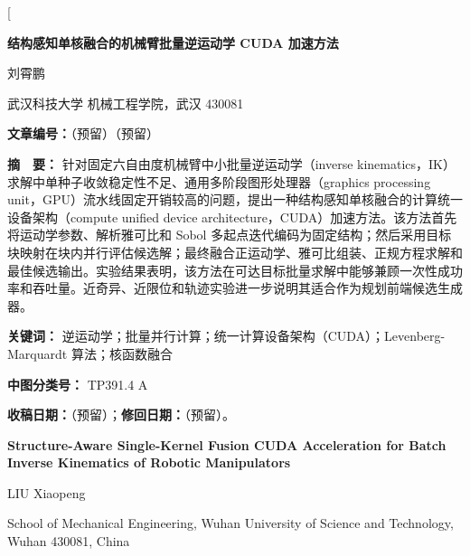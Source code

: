 \documentclass[twocolumn,a4paper,10pt]{ctexart}
\begin{document}
\twocolumn[%
{\centering
{\LARGE\bfseries 结构感知单核融合的机械臂批量逆运动学 CUDA 加速方法}\par\vspace{4mm}
{\large 刘霄鹏}\par\vspace{1mm}
{\small 武汉科技大学 机械工程学院，武汉 430081}\par\vspace{3mm}
{\small\bfseries 文章编号：}（预留）（预留）\par\vspace{2mm}
\begin{minipage}{0.91\textwidth}\small
{\bfseries 摘　要：} 针对固定六自由度机械臂中小批量逆运动学（inverse kinematics，IK）求解中单种子收敛稳定性不足、通用多阶段图形处理器（graphics processing unit，GPU）流水线固定开销较高的问题，提出一种结构感知单核融合的计算统一设备架构（compute unified device architecture，CUDA）加速方法。该方法首先将运动学参数、解析雅可比和 Sobol 多起点迭代编码为固定结构；然后采用目标块映射在块内并行评估候选解；最终融合正运动学、雅可比组装、正规方程求解和最佳候选输出。实验结果表明，该方法在可达目标批量求解中能够兼顾一次性成功率和吞吐量。近奇异、近限位和轨迹实验进一步说明其适合作为规划前端候选生成器。\par\vspace{2mm}
{\bfseries 关键词：} 逆运动学；批量并行计算；统一计算设备架构（CUDA）；Levenberg-Marquardt 算法；核函数融合\par
{\bfseries 中图分类号：} TP391.4 A\par
{\bfseries 收稿日期：}（预留）；{\bfseries 修回日期：}（预留）。\par
\end{minipage}\par\vspace{4mm}
\begin{minipage}{0.91\textwidth}\small
{\centering
{\bfseries\large Structure-Aware Single-Kernel Fusion CUDA Acceleration for Batch Inverse Kinematics of Robotic Manipulators}\par\vspace{2mm}
{\small LIU Xiaopeng}\par\vspace{1mm}
{\small School of Mechanical Engineering, Wuhan University of Science and Technology, Wuhan 430081, China}\par\vspace{3mm}
}

\end{minipage}}
\end{document}
